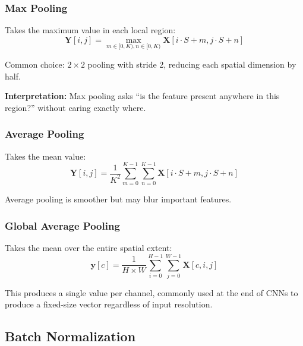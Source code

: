 \subsubsection{Max Pooling}

Takes the maximum value in each local region:
\begin{equation}
\mathbf{Y}[i, j] = \max_{m \in [0, K), n \in [0, K)} \mathbf{X}[i \cdot S + m, j \cdot S + n]
\label{eq:max_pool}
\end{equation}

Common choice: $2 \times 2$ pooling with stride 2, reducing each spatial dimension by half.

\textbf{Interpretation:} Max pooling asks ``is the feature present anywhere in this region?'' without caring exactly where.

\subsubsection{Average Pooling}

Takes the mean value:
\begin{equation}
\mathbf{Y}[i, j] = \frac{1}{K^2} \sum_{m=0}^{K-1} \sum_{n=0}^{K-1} \mathbf{X}[i \cdot S + m, j \cdot S + n]
\label{eq:avg_pool}
\end{equation}

Average pooling is smoother but may blur important features.

\subsubsection{Global Average Pooling}

Takes the mean over the entire spatial extent:
\begin{equation}
\mathbf{y}[c] = \frac{1}{H \times W} \sum_{i=0}^{H-1} \sum_{j=0}^{W-1} \mathbf{X}[c, i, j]
\label{eq:global_avg_pool}
\end{equation}

This produces a single value per channel, commonly used at the end of CNNs to produce a fixed-size vector regardless of input resolution.


\subsection{Batch Normalization}

